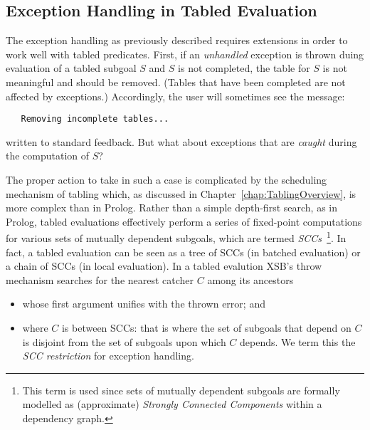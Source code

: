 \subsection{Exception Handling in Tabled Evaluation} \label{sec:exceptions-w-tables}
%
The exception handling as previously described requires extensions in
order to work well with tabled predicates.  First, if an {\em
  unhandled} exception is thrown duing evaluation of a tabled subgoal
$S$ and $S$ is not completed, the table for $S$ is not meaningful and
should be removed.  (Tables that have been completed are not affected
by exceptions.)  Accordingly, the user will sometimes see the message:
%
\begin{verbatim}
   Removing incomplete tables...
\end{verbatim}
%
written to standard feedback.  But what about exceptions that are {\em
  caught} during the computation of $S$?

The proper action to take in such a case is complicated by the
scheduling mechanism of tabling which, as discussed in
Chapter~\ref{chap:TablingOverview}, is more complex than in Prolog.
Rather than a simple depth-first search, as in Prolog, tabled
evaluations effectively perform a series of fixed-point computations
for various sets of mutually dependent subgoals, which are termed {\em
  SCCs}~\footnote{This term is used since sets of mutually dependent
  subgoals are formally modelled as (approximate) {\em Strongly
    Connected Components} within a dependency graph.}.  In fact, a
tabled evaluation can be seen as a tree of SCCs (in batched
evaluation) or a chain of SCCs (in local evaluation).  In a tabled
evalution XSB's throw mechanism searches for the nearest catcher $C$
among its ancestors
%
\begin{itemize}
\item whose first argument unifies with the thrown error; and
\item where $C$ is between SCCs: that is where the set of subgoals
  that depend on $C$ is disjoint from the set of subgoals upon which
  $C$ depends.  We term this the {\em SCC restriction} for exception
  handling.
\end{itemize}
%

